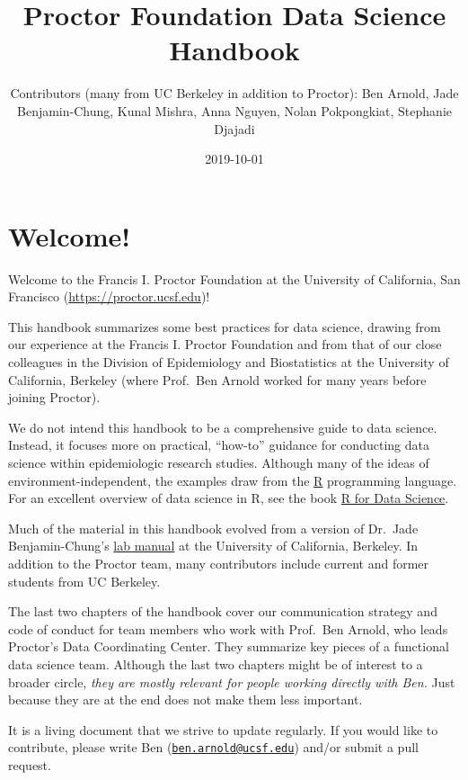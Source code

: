 \documentclass[]{book}
\title{Proctor Foundation Data Science Handbook}
\author{Contributors (many from UC Berkeley in addition to Proctor): Ben Arnold, Jade Benjamin-Chung, Kunal Mishra, Anna Nguyen, Nolan Pokpongkiat, Stephanie Djajadi}
\date{2019-10-01}
\begin{document}
\maketitle

{
\setcounter{tocdepth}{1}
\tableofcontents
}
\hypertarget{welcome}{%
\chapter*{Welcome!}\label{welcome}}

Welcome to the Francis I. Proctor Foundation at the University of California, San Francisco (\url{https://proctor.ucsf.edu})!

This handbook summarizes some best practices for data science, drawing from our experience at the Francis I. Proctor Foundation and from that of our close colleagues in the Division of Epidemiology and Biostatistics at the University of California, Berkeley (where Prof.~Ben Arnold worked for many years before joining Proctor).

We do not intend this handbook to be a comprehensive guide to data science. Instead, it focuses more on practical, ``how-to'' guidance for conducting data science within epidemiologic research studies. Although many of the ideas of environment-independent, the examples draw from the \href{https://cran.r-project.org/}{R} programming language. For an excellent overview of data science in R, see the book \href{https://r4ds.had.co.nz/}{R for Data Science}.

Much of the material in this handbook evolved from a version of Dr.~Jade Benjamin-Chung's \href{https://github.com/jadebc-berkeley/lab-manual}{lab manual} at the University of California, Berkeley. In addition to the Proctor team, many contributors include current and former students from UC Berkeley.

The last two chapters of the handbook cover our communication strategy and code of conduct for team members who work with Prof.~Ben Arnold, who leads Proctor's Data Coordinating Center. They summarize key pieces of a functional data science team. Although the last two chapters might be of interest to a broader circle, \emph{they are mostly relevant for people working directly with Ben.} Just because they are at the end does not make them less important.

It is a living document that we strive to update regularly. If you would like to contribute, please write Ben (\href{mailto:ben.arnold@ucsf.edu}{\nolinkurl{ben.arnold@ucsf.edu}}) and/or submit a pull request.
\end{document}
